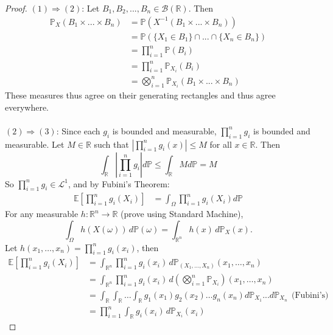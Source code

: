 \documentclass[11pt,a4paper]{article}
\theoremstyle{definition}
\begin{document}
\begin{proof}
    $(1) \Longrightarrow (2)$: Let $B_1, B_2, ..., B_n \in \mathcal{B}(\mathbb{R})$. Then \begin{align*}
        \mathbb{P}_X(B_1 \times ...\times B_n) & = \mathbb{P}(X^{-1}(B_1 \times ... \times B_n)) \\ & = \mathbb{P}(\{X_1 \in B_1\} \cap ... \cap \{X_n \in B_n\}) \\ & = \prod \limits _{i=1}^n \mathbb{P}(B_i) \\ & = \prod \limits _{i=1}^n \mathbb{P}_{X_i} (B_i) \\ & = \bigotimes \limits _{i=1}^n \mathbb{P}_{X_i}(B_1 \times ... \times B_n)
    \end{align*}
    These measures thus agree on their generating rectangles and thus agree everywhere.
    ~\\~\\ $(2) \Longrightarrow (3)$: Since each $g_i$ is bounded and measurable, $\prod \limits _{i=1}^n g_i$ is bounded and measurable. Let $M \in \mathbb{R}$ such that $\left |\prod \limits _{i=1}^n g_i (x)\right| \le M$ for all $x \in \mathbb{R}$. Then \[
    \int _{\mathbb{R}} \left |\prod \limits _{i=1}^n g_i \right | d\mathbb{P} \le \int _{\mathbb{R}} M d\mathbb{P} = M
    \]
    So $\prod \limits _{i=1}^n g_i \in \mathcal{L}^1$, and by Fubini's Theorem: 
    \begin{align*}
        \mathbb{E} \left [ \prod \limits _{i=1}^n g_i(X_i)  \right ] & = \int _{\Omega }\prod \limits _{i=1}^n g_i(X_i) d\mathbb{P} 
    \end{align*}
    For any measurable $h:\mathbb{R}^n\to\mathbb{R}$ (prove using Standard Machine),
\[
\int_{\Omega} h(X(\omega))\, d\mathbb{P}(\omega)
     = \int_{\mathbb{R}^n} h(x)\, d\mathbb{P}_X(x).
\]
Let $h(x_1,\dots,x_n)=\prod\limits_{i=1}^n g_i(x_i)$, then
\begin{align*}
\mathbb{E}\!\left[\prod_{i=1}^n g_i(X_i)\right]
    & = \int_{\mathbb{R}^n} \prod_{i=1}^n g_i(x_i)\,
        d\mathbb{P}_{(X_1,\dots,X_n)}(x_1,\dots,x_n) \\ &= \int_{\mathbb{R}^n} 
        \prod_{i=1}^n g_i(x_i)\,
    d\!\left( \bigotimes_{i=1}^n \mathbb{P}_{X_i} \right)(x_1,\dots,x_n) 
    \\ & = \int _\mathbb{R} \int _{\mathbb{R}} \ldots \int _{\mathbb{R}} g_1(x_1)g_2(x_2)\ldots g_n(x_n) d\mathbb{P}_{X_1}...d\mathbb{P}_{X_n} \ \ \text{(Fubini's)}
    \\ & = \prod_{i=1}^n \int_{\mathbb{R}} g_i(x_i)\, d\mathbb{P}_{X_i}(x_i)
\end{align*}



\end{proof}
\end{document}
